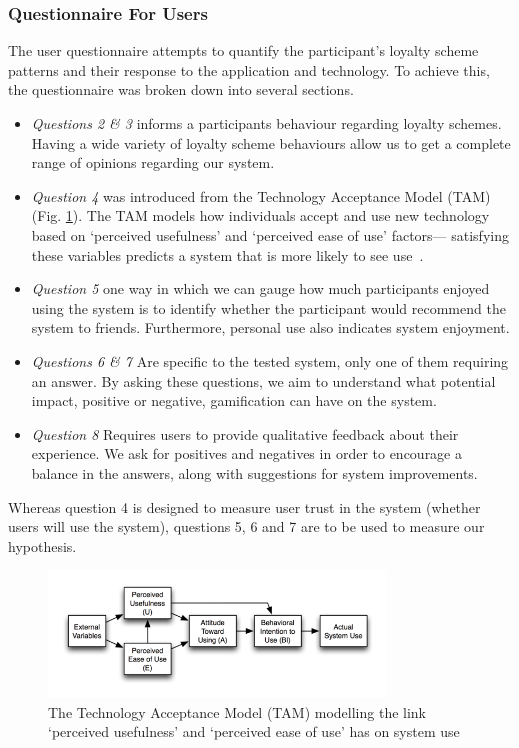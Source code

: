 \subsubsection{Questionnaire For Users}
The user questionnaire attempts to quantify the participant's loyalty scheme patterns and their response to the application and technology. To achieve this, the questionnaire was broken down into several sections.
\begin{itemize}
	\item \emph{Questions 2 \& 3} informs a participants behaviour regarding loyalty schemes. Having a wide variety of loyalty scheme behaviours allow us to get a complete range of opinions regarding our system.
	\item \emph{Question 4} was introduced from the Technology Acceptance Model (TAM)~\cite{tam} (Fig. \ref{fig:TAM}). The TAM models how individuals accept and use new technology based on `perceived usefulness' and `perceived ease of use' factors--- satisfying these variables predicts a system that is more likely to see use~\cite{tam}.
	\item \emph{Question 5} one way in which we can gauge how much participants enjoyed using the system is to identify whether the participant would recommend the system to friends. Furthermore, personal use also indicates system enjoyment.  
	\item \emph{Questions 6 \& 7} Are specific to the tested system, only one of them requiring an answer. By asking these questions, we aim to understand what potential impact, positive or negative, gamification can have on the system. 
	\item \emph{Question 8} Requires users to provide qualitative feedback about their experience. We ask for positives and negatives in order to encourage a balance in the answers, along with suggestions for system improvements.
\end{itemize}

Whereas question 4 is designed to measure user trust in the system (whether users will use the system), questions 5, 6 and 7 are to be used to measure our hypothesis.

\begin{figure}[H]
 \centering
  \includegraphics[width=0.80\textwidth]{img/TAM.png}
     \caption{The Technology Acceptance Model (TAM) modelling the link `perceived usefulness' and `perceived ease of use' has on system use }
     \label{fig:TAM}
\end{figure}

